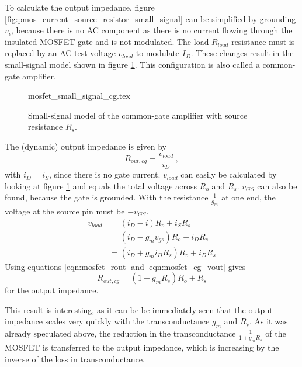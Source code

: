 To calculate the output impedance, figure \ref{fig:pmos_current_source_resistor_small_signal} can be simplified by grounding $v_i$, because there is no AC component as there is no current flowing through the insulated MOSFET gate and is not modulated. The load $R_{load}$ resistance must is replaced by an AC test voltage $v_{load}$ to modulate $I_D$. These changes result in the small-signal model shown in figure \ref{fig:pmos_common_gate_amplifier}. This configuration is also called a common-gate amplifier.
\begin{figure}[ht]
    \centering
    {mosfet_small_signal_cg.tex}
    \caption{Small-signal model of the common-gate amplifier with source resistance $R_s$.}
    \label{fig:pmos_common_gate_amplifier}
\end{figure}

The (dynamic) output impedance is given by
\begin{equation}
    R_{out,cg} = \frac{v_{load}}{i_D}\,, \label{eqn:mosfet_rout}
\end{equation}
with $i_D = i_S$, since there is no gate current. $v_{load}$ can easily be calculated by looking at figure \ref{fig:pmos_common_gate_amplifier} and equals the total voltage across $R_o$ and $R_s$. $v_{GS}$ can also be found, because the gate is grounded. With the resistance $\frac{1}{g_m}$ at one end, the voltage at the source pin must be $-v_{GS}$.
\begin{align}
    v_{load} &= \left(i_D - i\right) R_o + i_S R_s \nonumber\\
    &= \left(i_D - g_m v_{gs}\right) R_o + i_D R_s \nonumber\\
    &= \left(i_D + g_m i_D R_s\right) R_o + i_D R_s \label{eqn:mosfet_cg_vout}
\end{align}
Using equations \ref{eqn:mosfet_rout} and \ref{eqn:mosfet_cg_vout} gives
\begin{equation}
    R_{out,cg} = \left(1 + g_m R_s\right) R_o + R_s \label{eqn:mosfet_cg_rout}
\end{equation}
for the output impedance.

This result is interesting, as it can be be immediately seen that the output impedance scales very quickly with the transconductance $g_m$ and $R_s$. As it was already speculated above, the reduction in the transconductance $\frac{1}{1 + g_m R_s}$ of the MOSFET is transferred to the output impedance, which is increasing by the inverse of the loss in transconductance.

